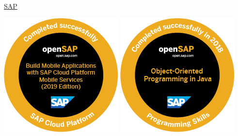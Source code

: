 
\begin{cventries}

\vspace{-0.25cm}

  \cventry
    {} %
    {\href{https://www.sap.com/index.html}{SAP}\vspace{-0.5cm}} %
    {} %
    {} %
    {
    \begin{center}
    \href{https://open.sap.com/verify/xicav-sakyr-fopyh-kyfal-tunah}{\includegraphics[scale=0.40]{badges/mobile3_open_badge.png}}
	\hspace{0.1cm}
	\href{https://open.sap.com/verify/xocis-tyvip-gynuh-byneg-punel}{\includegraphics[scale=0.40]{badges/java1_open_badge}}

\end{center}}
\end{cventries}
